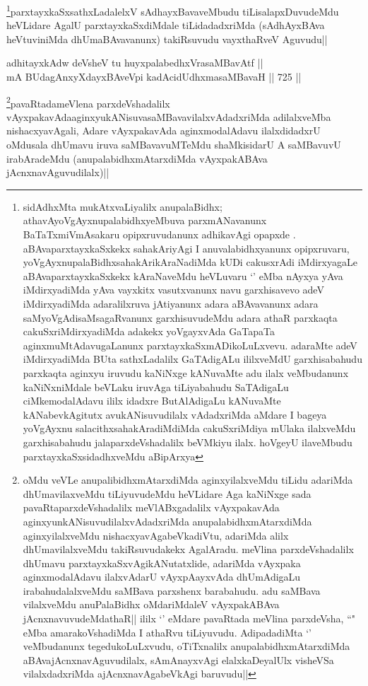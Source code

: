 \begin{artha}
\footnote{sidAdhxMta mukAtxvaLiyalilx anupalaBidhx; athavAyoVgAyxnupalabidhxyeMbuva parxmANavanunx BaTaTxmiVmAsakaru opipxruvudanunx adhikavAgi opapxde . aBAvaparxtayxkaSxkekx sahakAriyAgi I anuvalabidhxyanunx opipxruvaru, yoVgAyxnupalaBidhxsahakArikAraNadiMda kUDi cakusxrAdi iMdirxyagaLe aBAvaparxtayxkaSxkekx  kAraNaveMdu heVLuvaru `\stext' eMba nAyxya yAva iMdirxyadiMda yAva vayxkitx vasutxvanunx navu garxhisavevo adeV iMdirxyadiMda adaralilxruva jAtiyanunx adara aBAvavanunx adara saMyoVgAdisaMsagaRvanunx garxhisuvudeMdu adara athaR parxkaqta cakuSxriMdirxyadiMda adakekx yoVgayxvAda GaTapaTa aginxmuMtAdavugaLanunx parxtayxkaSxmADikoLuLxvevu. adaraMte adeV iMdirxyadiMda BUta sathxLadalilx GaTAdigALu ililxveMdU garxhisabahudu parxkaqta aginxyu iruvudu kaNiNxge kANuvaMte adu ilalx veMbudanunx kaNiNxniMdale beVLaku iruvAga tiLiyabahudu  SaTAdigaLu ciMkemodalAdavu ililx idadxre ButAlAdigaLu kANuvaMte kANabevkAgitutx avukANisuvudilalx vAdadxriMda aMdare I bageya yoVgAyxnu salacithxsahakAradiMdiMda cakuSxriMdiya mUlaka ilalxveMdu garxhisabahudu jalaparxdeVshadalilx beVMkiyu ilalx. hoVgeyU ilaveMbudu parxtayxkaSxsidadhxveMdu aBipArxya}parxtayxkaSxsathxLadalelxV sAdhayxBavaveMbudu tiLisalapxDuvudeMdu heVLidare AgalU parxtayxkaSxdiMdale tiLidadadxriMda (sAdhAyxBAva heVtuviniMda dhUmaBAvavanunx) takiRsuvudu vayxthaRveV Aguvudu||
\end{artha}

\begin{shl}
adhitayxkAdw deVsheV tu huyxpalabedhxVrasaMBavAtf || \\
mA BUdagAnxyXdayxBAveV\s pi kadAcidUdhxmasaMBavaH ||  725 ||  
\end{shl}

\begin{artha}
\footnote{oMdu veVLe anupalibidhxmAtarxdiMda aginxyilalxveMdu tiLidu adariMda dhUmavilaxveMdu tiLiyuvudeMdu heVLidare Aga kaNiNxge sada pavaRtaparxdeVshadalilx meVlABxgadalilx vAyxpakavAda aginxyunkANisuvudilalxvAdadxriMda anupalabidhxmAtarxdiMda aginxyilalxveMdu nishacxyavAgabeVkadiVtu, adariMda alilx dhUmavilalxveMdu takiRsuvudakekx AgalAradu.  meVlina parxdeVshadalilx dhUmavu parxtayxkaSxvAgikANutatxlide,  adariMda vAyxpaka aginxmodalAdavu ilalxvAdarU vAyxpAayxvAda dhUmAdigaLu irabahudalalxveMdu saMBava parxshenx barabahudu. adu saMBava vilalxveMdu anuPalaBidhx oMdariMdaleV vAyxpakABAva jAcnxnavuvudeMdathaR|| ililx `\stext' eMdare pavaRtada meVlina parxdeVsha, ``\stext" eMba amarakoVshadiMda I athaRvu tiLiyuvudu. AdipadadiMta `\stext' veMbudanunx tegedukoLuLxvudu, oTiTxnalilx anupalabidhxmAtarxdiMda aBAvajAcnxnavAguvudilalx, sAmAnayxvAgi elalxkaDeyalUlx visheVSa vilalxdadxriMda ajAcnxnavAgabeVkAgi baruvudu||}pavaRtadameVlena parxdeVshadalilx vAyxpakavAdaaginxyukANisuvasaMBavavilalxvAdadxriMda adilalxveMba nishacxyavAgali, Adare vAyxpakavAda aginxmodalAdavu ilalxdidadxrU oMdusala dhUmavu iruva saMBavavuMTeMdu shaMkisidarU A saMBavuvU irabAradeMdu (anupalabidhxmAtarxdiMda vAyxpakABAva jAcnxnavAguvudilalx)||
\end{artha}

